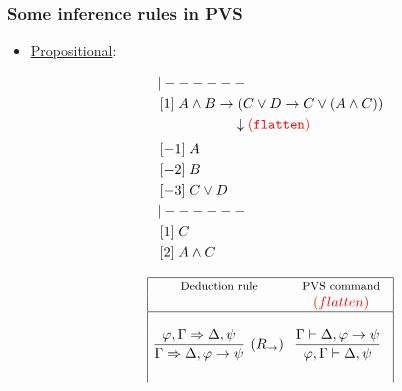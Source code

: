 \documentclass[10pt]{beamer}
\begin{document}

\begin{frame}
	\frametitle{Some inference rules in PVS}
\begin{itemize}
\item \underline{{\color{blue}Propositional}}:

\begin{minipage}{.48\textwidth}
{\small
\[\begin{array}{l}
     {\small{\tt{|------}}} \\[1mm]
     \,[1]\;  A \wedge B \rightarrow (C \vee D \rightarrow C \vee  (A
    \wedge C)) \\[1mm]
    \hspace{20mm}\downarrow {\color{red}{\tt (flatten)}}\\[2mm]
     \,[-1]\; A  \\[1mm]
     \,[-2]\; B \\[1mm]
     \,[-3]\; C \vee D \\[1mm]
     {\small{\tt{|------}}} \\[1mm]
     \,[1]\; C \\[1mm]
     \,[2]\; A \wedge C 
   \end{array}      
   \] 
}
\end{minipage}
\begin{minipage}{.4\textwidth}
{\scriptsize
\begin{table}
\vspace{-7mm}
\[\begin{array}{|c@{\hspace{.3cm}}c|}
\hline
\mbox{\footnotesize Deduction rule} & \mbox{\footnotesize PVS command} \\
& {\color{red}(flatten)} \\
\hline
&\\
\infer[(R_\rightarrow)]{\Gamma\Rightarrow\Delta,\varphi\rightarrow\psi}{\varphi,\Gamma\Rightarrow\Delta,
  \psi} &
\infer[]{\varphi,\Gamma\vdash\Delta, \psi}{\Gamma\vdash\Delta,\varphi\rightarrow\psi}\\[5mm]

\end{array}\]
\end{table}}
\end{minipage}
\end{itemize}
\end{frame}
\end{document}
